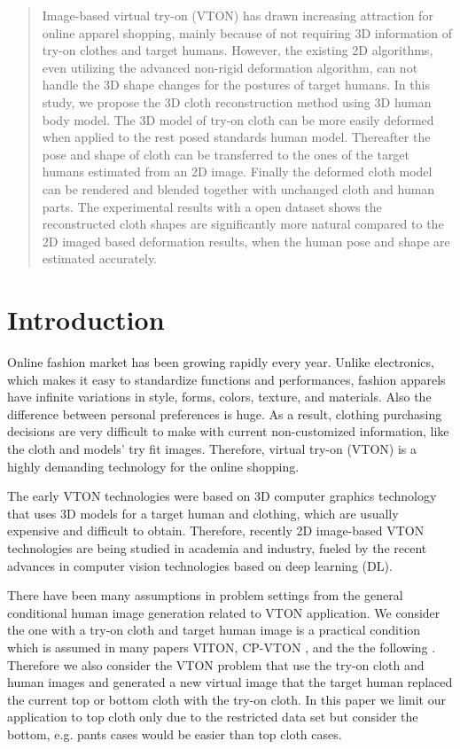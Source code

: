 \documentclass[runningheads]{llncs}
\begin{document}
\begin{abstract}

Image-based virtual try-on (VTON) has drawn increasing attraction for online apparel shopping, mainly because of not requiring 3D information of try-on clothes and target humans. However, the existing 2D algorithms, even utilizing the advanced non-rigid deformation algorithm, can not handle the 3D shape changes for the postures of target humans. In this study, we propose the 3D cloth reconstruction method using 3D human body model. The 3D model of try-on cloth can be more easily deformed when applied to the rest posed standards human model. Thereafter the pose and shape of cloth can be transferred to the ones of the target humans estimated from an 2D image. Finally the deformed cloth model can be rendered and blended together with unchanged cloth and human parts. The experimental results with a open dataset shows the reconstructed cloth shapes are significantly more natural compared to the 2D imaged based deformation results, when the human pose and shape are estimated accurately.         

\end{abstract}


\section{Introduction}

Online fashion market has been growing rapidly every year. Unlike electronics, which makes it easy to standardize functions and performances, fashion apparels have infinite variations in style, forms, colors, texture, and materials.  Also the difference between personal preferences is huge. As a result, clothing purchasing decisions are very difficult to make with current non-customized information, like the cloth and models' try fit images. Therefore, virtual try-on (VTON) is a highly demanding technology for the online shopping. 

The early VTON technologies were based on 3D computer graphics technology that uses 3D models for a target human and clothing, which are usually expensive and difficult to obtain. Therefore, recently 2D image-based VTON technologies are being studied in academia and industry, fueled by the recent advances in computer vision technologies based on deep learning (DL). 

There have been many assumptions in problem settings from the general conditional human image generation related to VTON application. We consider the one with a try-on cloth and target human image is a practical condition which is assumed in many papers VITON\cite{Han2017VITONAI}, CP-VTON\cite{Wang2018TowardCI} , and the the following  \cite{Sun2019ImageBasedVT,Yu_2019_ICCV}. Therefore we also consider the VTON problem that use the try-on cloth and human images and generated a new virtual image that the target human replaced the current top or bottom cloth with the try-on cloth. In this paper we limit our application to top cloth only due to the restricted data set but consider the bottom, e.g. pants cases would be easier than top cloth cases.
\end{document}
